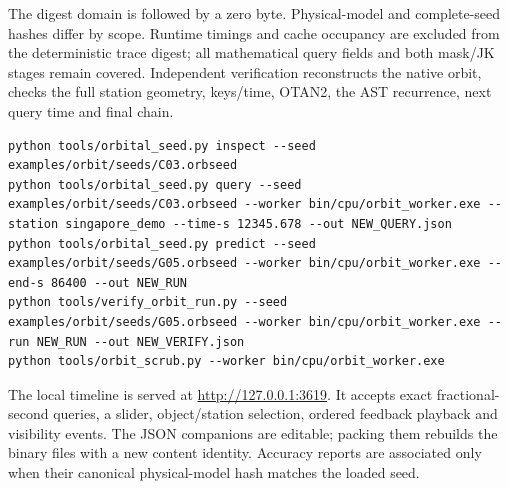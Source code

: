 The digest domain is  followed by a
zero byte. Physical-model and complete-seed hashes differ by scope. Runtime
timings and cache occupancy are excluded from the deterministic trace digest;
all mathematical query fields and both mask/JK stages remain covered. Independent
verification reconstructs the native orbit, checks the full station geometry,
keys/time, OTAN2, the AST recurrence, next query time and final chain.

\begin{lstlisting}
python tools/orbital_seed.py inspect --seed examples/orbit/seeds/C03.orbseed
python tools/orbital_seed.py query --seed examples/orbit/seeds/C03.orbseed --worker bin/cpu/orbit_worker.exe --station singapore_demo --time-s 12345.678 --out NEW_QUERY.json
python tools/orbital_seed.py predict --seed examples/orbit/seeds/G05.orbseed --worker bin/cpu/orbit_worker.exe --end-s 86400 --out NEW_RUN
python tools/verify_orbit_run.py --seed examples/orbit/seeds/G05.orbseed --worker bin/cpu/orbit_worker.exe --run NEW_RUN --out NEW_VERIFY.json
python tools/orbit_scrub.py --worker bin/cpu/orbit_worker.exe
\end{lstlisting}
The local timeline is served at \url{http://127.0.0.1:3619}. It accepts exact
fractional-second queries, a slider, object/station selection, ordered feedback
playback and visibility events. The JSON companions are editable; packing them
rebuilds the binary  files with a new content identity. Accuracy reports are associated only when
their canonical physical-model hash matches the loaded seed.



\clearpage
